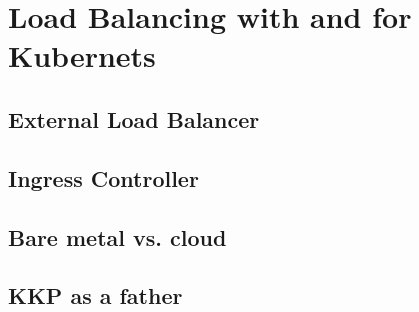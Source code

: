 \chapter{Load Balancing with and for Kubernets}

\section{External Load Balancer}

\section{Ingress Controller}

\section{Bare metal vs. cloud}

\section{KKP as a father}

